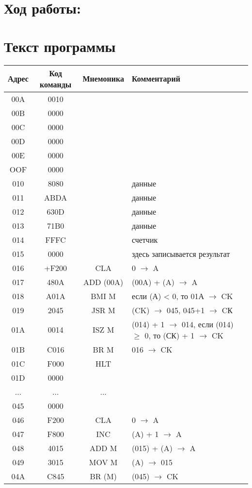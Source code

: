 \documentclass[a4paper,14pt]{article}
\begin{document}
\section*{Ход работы:}

\section{Текст программы}
\begin{tabular}{|c|c|c|l|}
\hline
\textbf{Адрес} & \textbf{Код команды} & \textbf{Мнемоника} & \textbf{Комментарий} \\\hline
00A & 0010 &&\\
00B & 0000 &&\\
00C & 0000 &&\\
00D & 0000 &&\\
00E & 0000 &&\\
OOF & 0000 &&\\
010 & 8080 &  & данные\\
011 & ABDA &  & данные\\
012 & 630D &  & данные\\
013 & 71B0 &  & данные\\
014 & FFFC &  & счетчик\\
015 & 0000 &  & здесь записывается результат\\
016 & +F200 & CLA & 0 $\to$ A\\
017 & 480A & ADD (00A) & (00A) + (A) $\to$ A\\
018 & A01A & BMI M & если (А) < 0, то 01А $\to$ CK\\
019 & 2045 & JSR M & (CK) $\to$ 045, 045+1 $\to$ CК\\
01A & 0014 & ISZ M & (014) + 1 $\to$ 014, если (014) $\ge$ 0, то (СК) + 1 $\to$ CK\\
01B & C016 & BR M & 016 $\to$ CK\\
01C & F000 & HLT &\\
01D & 0000&&\\
...&...&...&\\
045 & 0000 &&\\
046 & F200 & CLA & 0 $\to$ A\\
047 & F800 & INC & (A) + 1 $\to$ A\\
048 & 4015 & ADD M & (015) + (A) $\to$ A\\
049 & 3015 & MOV M & (A) $\to$ 015\\
04A & C845 & BR (M) & (045) $\to$ CK\\
\hline
\end{tabular}
\end{document}
